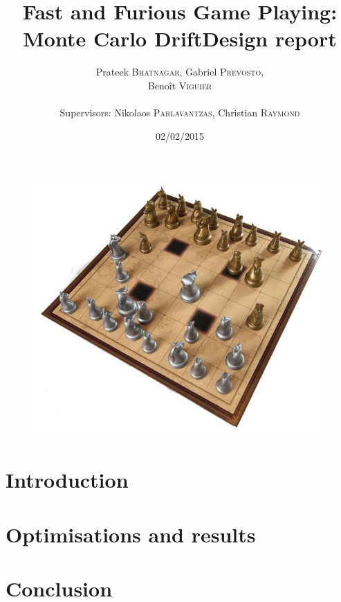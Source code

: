 \documentclass[12pt]{article}
\title{Fast and Furious Game Playing: Monte Carlo Drift\smallbreak Design report} %
\author{Prateek \textsc{Bhatnagar}, Gabriel \textsc{Prevosto}, \\
        Benoît \textsc{Viguier} \\
        \\
        Supervisors: Nikolaos \textsc{Parlavantzas}, Christian \textsc{Raymond}}
\date{02/02/2015}
\begin{document}
\maketitle

\begin{figure}[!h] 
\centerline{\includegraphics[scale=0.50]{Pictures/Arimaa}}
\end{figure}
\newpage

\tableofcontents
\newpage


\section{Introduction}				\label{sec:introduction} 		

\newpage

\section{Optimisations and results}        \label{sec:optimisations}    
\newpage
	\section{Conclusion}			\label{sec:conclusion}			
\newpage	



\end{document}
